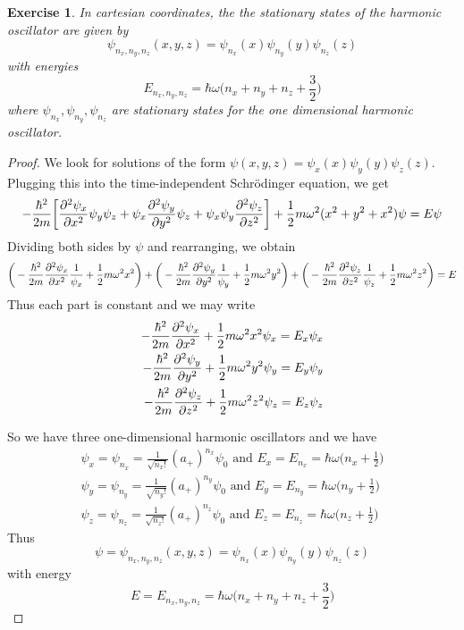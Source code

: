 \documentclass[12pt]{amsart}
\newtheorem{ex}[thm]{Exercise}
\newcommand{\sch}{Schr\"{o}dinger }
\newcommand{\om}{\omega}
\begin{document}
\begin{ex}
In cartesian coordinates, the the stationary states of the harmonic oscillator are given by $$\psi_{n_x, n_y, n_z}(x,y,z) = \psi_{n_x}(x)\psi_{n_y}(y)\psi_{n_z}(z)$$ with energies $$E_{n_x,n_y, n_z} = \hbar \om \bigg (n_x + n_y + n_z + \frac{3}{2} \bigg)$$ where $\psi_{n_x}, \psi_{n_y}, \psi_{n_z}$ are stationary states for the one dimensional harmonic oscillator.
\end{ex}

\begin{proof}
We look for solutions of the form $\psi(x,y,z) = \psi_x(x) \psi_y(y) \psi_z(z)$. Plugging this into the time-independent \sch equation, we get $$-\frac{\hbar^2}{2m}\bigg[ \pdv[2]{\psi_x}{x}\psi_y \psi_z + \psi_x \pdv[2]{\psi_y}{y} \psi_z  + \psi_x \psi_y \pdv[2]{\psi_z}{z} \bigg] + \frac{1}{2}m \omega^2(x^2 + y^2 + x^2) \psi = E\psi$$ Dividing both sides by $\psi$ and rearranging, we obtain $$\bigg(-\frac{\hbar^2}{2m}\pdv[2]{\psi_x}{x}\frac{1}{\psi_x} + \frac{1}{2}m \om^2x^2\bigg) + \bigg(-\frac{\hbar^2}{2m}\pdv[2]{\psi_y}{y}\frac{1}{\psi_y} + \frac{1}{2}m \om^2y^2\bigg)+ \bigg(-\frac{\hbar^2}{2m}\pdv[2]{\psi_z}{z}\frac{1}{\psi_z} + \frac{1}{2}m \om^2z^2\bigg) = E $$ 
Thus each part is constant and we may write 
\begin{align*}
-\frac{\hbar^2}{2m}\pdv[2]{\psi_x}{x} + \frac{1}{2}m \om^2x^2\psi_x = E_x\psi_x \\ 
-\frac{\hbar^2}{2m}\pdv[2]{\psi_y}{y} + \frac{1}{2}m \om^2y^2\psi_y = E_y\psi_y \\
-\frac{\hbar^2}{2m}\pdv[2]{\psi_z}{z} + \frac{1}{2}m \om^2z^2\psi_z = E_z\psi_z
\end{align*}

So we have three one-dimensional harmonic oscillators and we have 
\begin{align*}
\psi_x = \psi_{n_x} = \frac{1}{\sqrt{{n_x}!}}(a_+)^{n_x} \psi_0 \text{ and } E_x = E_{n_x} = \hbar \om \bigg( n_x +\frac{1}{2}\bigg)\\
\psi_y = \psi_{n_y} = \frac{1}{\sqrt{{n_y}!}}(a_+)^{n_y} \psi_0 \text{ and } E_y = E_{n_y} = \hbar \om \bigg( n_y +\frac{1}{2}\bigg)\\
\psi_z = \psi_{n_z} = \frac{1}{\sqrt{{n_z}!}}(a_+)^{n_z} \psi_0 \text{ and } E_z = E_{n_z} = \hbar \om \bigg( n_z +\frac{1}{2}\bigg)
\end{align*}
Thus $$\psi = \psi_{n_x, n_y, n_z}(x,y,z) = \psi_{n_x}(x)\psi_{n_y}(y)\psi_{n_z}(z)$$ with energy $$E = E_{n_x,n_y, n_z} = \hbar \om \bigg (n_x + n_y + n_z + \frac{3}{2} \bigg)$$
\end{proof}
\end{document}
